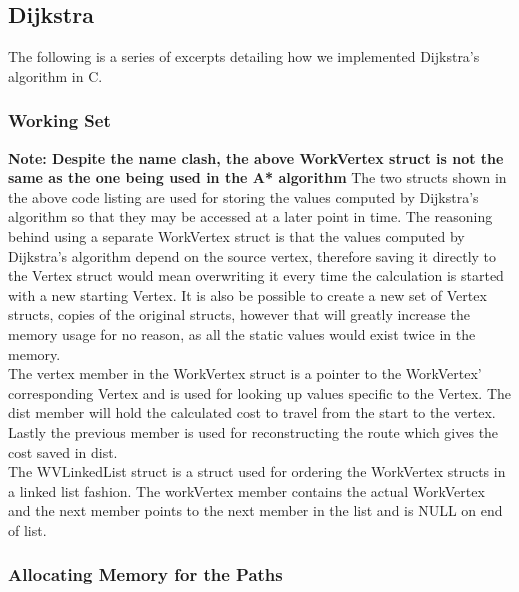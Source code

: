 \subsection{Dijkstra}

The following is a series of excerpts detailing how we implemented Dijkstra's algorithm in C.

\subsubsection{Working Set}



\textbf{Note: Despite the name clash, the above WorkVertex struct is not the same as the one being used in the A* algorithm}
The two structs shown in the above code listing are used for storing the values computed by Dijkstra's algorithm so that they may be accessed at a later point in time. The reasoning behind using a separate WorkVertex struct is that the values computed by Dijkstra's algorithm depend on the source vertex, therefore saving it directly to the Vertex struct would mean overwriting it every time the calculation is started with a new starting Vertex. It is also be possible to create a new set of Vertex structs, copies of the original structs, however that will greatly increase the memory usage for no reason, as all the static values would exist twice in the memory.\\
The vertex member in the WorkVertex struct is a pointer to the WorkVertex' corresponding Vertex and is used for looking up values specific to the Vertex. The dist member will hold the calculated cost to travel from the start to the vertex. Lastly the previous member is used for reconstructing the route which gives the cost saved in dist.\\
The WVLinkedList struct is a struct used for ordering the WorkVertex structs in a linked list fashion. The workVertex member contains the actual WorkVertex and the next member points to the next member in the list and is NULL on end of list.

\subsubsection{Allocating Memory for the Paths}



